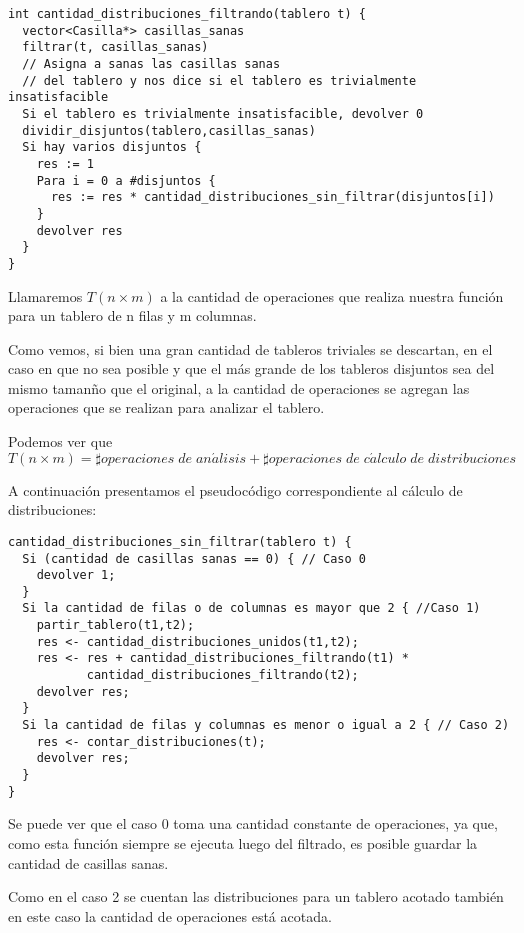 \documentclass[a4paper, 12pt] {article}
\begin{document}
\begin{verbatim}
int cantidad_distribuciones_filtrando(tablero t) {
  vector<Casilla*> casillas_sanas
  filtrar(t, casillas_sanas)  
  // Asigna a sanas las casillas sanas 
  // del tablero y nos dice si el tablero es trivialmente insatisfacible
  Si el tablero es trivialmente insatisfacible, devolver 0
  dividir_disjuntos(tablero,casillas_sanas)
  Si hay varios disjuntos {
    res := 1
    Para i = 0 a #disjuntos {
      res := res * cantidad_distribuciones_sin_filtrar(disjuntos[i])
    }
    devolver res
  }
}
\end{verbatim}


Llamaremos $T\left( n \times m\right) $ a la cantidad de operaciones que realiza nuestra funci\'on para un tablero de n filas y m columnas.


Como vemos, si bien una gran cantidad de tableros triviales se descartan, en el caso en que no sea posible y que el m\'as grande de los tableros disjuntos sea del mismo taman\~no que el original, a la cantidad de operaciones se agregan las operaciones que se realizan para analizar el tablero.


Podemos ver que \begin{equation} \label{eq:op_total}
T\left( n \times m\right) = \sharp operaciones\; de\; an\acute{a}lisis + \sharp operaciones \;de\; c\acute{a}lculo\; de\; distribuciones 
\end{equation}


A continuaci\'on presentamos el pseudoc\'odigo correspondiente al c\'alculo de distribuciones:

\begin{verbatim}
cantidad_distribuciones_sin_filtrar(tablero t) {
  Si (cantidad de casillas sanas == 0) { // Caso 0
    devolver 1;
  }
  Si la cantidad de filas o de columnas es mayor que 2 { //Caso 1)
    partir_tablero(t1,t2);
    res <- cantidad_distribuciones_unidos(t1,t2);
    res <- res + cantidad_distribuciones_filtrando(t1) * 
           cantidad_distribuciones_filtrando(t2);
    devolver res;
  }
  Si la cantidad de filas y columnas es menor o igual a 2 { // Caso 2)
    res <- contar_distribuciones(t);
    devolver res;
  }
}
\end{verbatim}


Se puede ver que el caso 0 toma una cantidad constante de operaciones, ya que, como esta funci\'on siempre se ejecuta luego del filtrado, es posible guardar la cantidad de casillas sanas. 

Como en el caso 2 se cuentan las distribuciones para un tablero acotado tambi\'en en este caso la cantidad de operaciones est\'a acotada.
\end{document}
